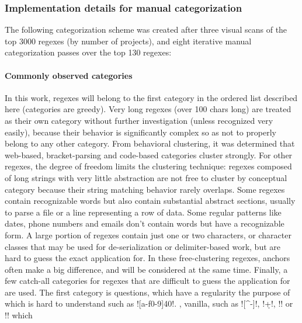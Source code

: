 \subsubsection{Implementation details for manual categorization}
The following categorization scheme was created after three visual scans of the top 3000 regexes (by number of projects), and eight iterative manual categorization passes over the top 130 regexes:

\paragraph{Commonly observed categories} In this work, regexes will belong to the first category in the ordered list described here (categories are greedy).  Very long regexes (over 100 chars long) are treated as their own category without further investigation (unless recognized very easily), because their behavior is significantly complex so as not to properly belong to any other category.  From behavioral clustering, it was determined that web-based, bracket-parsing and code-based categories cluster strongly.  For other regexes, the degree of freedom limits the clustering technique: regexes composed of long strings with very little abstraction are not free to cluster by conceptual category because their string matching behavior rarely overlaps.  Some regexes contain recognizable words but also contain substantial abstract sections, usually to parse a file or a line representing a row of data.  Some regular patterns like dates, phone numbers and emails don't contain words but have a recognizable form.  A large portion of regexes contain just one or two characters, or character classes that may be used for de-serialization or delimiter-based work, but are hard to guess the exact application for.  In these free-clustering regexes, anchors often make a big difference, and will be considered at the same time.  Finally, a few catch-all categories for regexes that are difficult to guess the application for are used.  The first category is questions, which have a regularity the purpose of which is hard to understand such as \cverb![a-f0-9]{40}!.  , vanilla, such as \cverb![^\w\s-]!, \cverb!\d+!, \cverb!! or \cverb!! which


